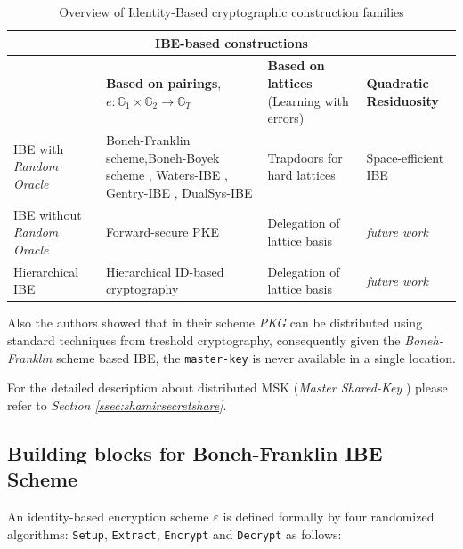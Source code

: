 \begin{table}[h]
    \centering
\begin{tabular}{ |p{3cm}||p{3cm}|p{3cm}|p{3cm}|  }
 \hline
 \multicolumn{4}{|c|}{IBE-based constructions} \\
 \hline
 & \textbf{Based on pairings}, $e: \mathbb{G}_1 \times \mathbb{G}_2 \rightarrow \mathbb{G}_T$ & \textbf{Based on lattices} (Learning with errors) & \textbf{Quadratic Residuosity} \\
 \hline
 IBE with \textit{Random Oracle}   & Boneh-Franklin scheme\cite{BF01},Boneh-Boyek scheme\cite{BB04}  , Waters-IBE\cite{Waters05} , Gentry-IBE\cite{Gentry06} , DualSys-IBE\cite{W09}     & Trapdoors for hard lattices\cite{GPV08} &   Space-efficient IBE\cite{BGH07}\\
 \hline
  IBE without \textit{Random Oracle}&  Forward-secure PKE\cite{CHK03}   &  Delegation of lattice basis\cite{CHKP10}   & \textit{future work}\\
  \hline
  Hierarchical IBE &  Hierarchical ID-based cryptography\cite{GS03} & Delegation of lattice basis\cite{CHKP10} & \textit{future work}\\
 \hline
\end{tabular}
    \caption{ Overview of Identity-Based cryptographic construction families  \cite{theory.ec.ibeupdate}}
    \label{tab:ibeupdated}
\end{table}


Also the authors showed that in their scheme \textit{PKG}
can be distributed using standard techniques from treshold
cryptography\cite{crypto.seckeydistdl}, consequently given the
\textit{Boneh-Franklin} scheme based IBE, the
\lstinline{master-key} is never available in a single location.

For the detailed description about distributed MSK (\textit{Master Shared-Key })
please refer to \textit{Section \ref{ssec:shamirsecretshare}}.


\subsection{Building blocks for Boneh-Franklin IBE Scheme}
\label{sec:ibe.bonehfranklin.scheme}

An identity-based encryption scheme $\varepsilon$ is defined formally
by four randomized algorithms: \lstinline{Setup}, \lstinline{Extract},
\lstinline{Encrypt} and \lstinline{Decrypt} as follows:

